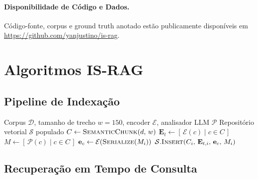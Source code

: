 \documentclass[11pt,a4paper]{article}
\begin{document}
\paragraph*{Disponibilidade de Código e Dados.}
Código-fonte, corpus e ground truth anotado estão publicamente
disponíveis em \url{https://github.com/yanjustino/is-rag}.



\appendix
\setcounter{section}{0}
\renewcommand{\thesection}{\Alph{section}}

\pagebreak
\section{Algoritmos IS-RAG}
\label{app:algorithms}

\subsection{Pipeline de Indexação}

\begin{algorithm}[H]
\caption{Indexação IS-RAG}\label{alg:index}
\begin{algorithmic}[1]
\Require Corpus $\mathcal{D}$, tamanho de trecho $w{=}150$,
         encoder $\mathcal{E}$, analisador LLM $\mathcal{P}$
\Ensure  Repositório vetorial $\mathcal{S}$ populado
  \State $C \gets \textsc{SemanticChunk}(d,\,w)$
  \State $\mathbf{E}_t \gets [\,\mathcal{E}(c) \mid c \in C\,]$
  \State $M \gets [\,\mathcal{P}(c) \mid c \in C\,]$
    \State $\mathbf{e}_c \gets \mathcal{E}(\textsc{Serialize}(M_i))$
    \State $\mathcal{S}.\textsc{Insert}(C_i,\,\mathbf{E}_{t,i},\,\mathbf{e}_c,\,M_i)$
  \EndFor
\EndFor
\end{algorithmic}
\end{algorithm}

\subsection{Recuperação em Tempo de Consulta}
\end{document}

